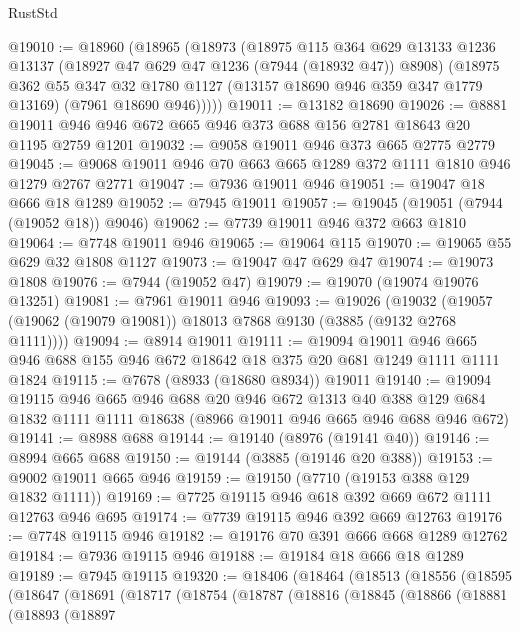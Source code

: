 \begin{lexlean}{RustStd}
\begin{coremodule}
@19010 := @18960
    (@18965
      (@18973
        (@18975
          @115
          @364
          @629
          @13133
          @1236
          @13137
          (@18927 @47 @629 @47 @1236 (@7944 (@18932 @47)) @8908)
          (@18975
            @362
            @55
            @347
            @32
            @1780
            @1127
            (@13157 @18690 @946 @359 @347 @1779 @13169)
            (@7961 @18690 @946)))))
@19011 := @13182 @18690
@19026 := @8881 @19011 @946 @946 @672 @665 @946 @373 @688 @156 @2781 @18643 @20 @1195 @2759 @1201
@19032 := @9058 @19011 @946 @373 @665 @2775 @2779
@19045 := @9068 @19011 @946 @70 @663 @665 @1289 @372 @1111 @1810 @946 @1279 @2767 @2771
@19047 := @7936 @19011 @946
@19051 := @19047 @18 @666 @18 @1289
@19052 := @7945 @19011
@19057 := @19045 (@19051 (@7944 (@19052 @18)) @9046)
@19062 := @7739 @19011 @946 @372 @663 @1810
@19064 := @7748 @19011 @946
@19065 := @19064 @115
@19070 := @19065 @55 @629 @32 @1808 @1127
@19073 := @19047 @47 @629 @47
@19074 := @19073 @1808
@19076 := @7944 (@19052 @47)
@19079 := @19070 (@19074 @19076 @13251)
@19081 := @7961 @19011 @946
@19093 := @19026
    (@19032 (@19057 (@19062 (@19079 @19081)) @18013 @7868 @9130 (@3885 (@9132 @2768 @1111))))
@19094 := @8914 @19011
@19111 := @19094
    @19011
    @946
    @665
    @946
    @688
    @155
    @946
    @672
    @18642
    @18
    @375
    @20
    @681
    @1249
    @1111
    @1111
    @1824
@19115 := @7678 (@8933 (@18680 @8934)) @19011
@19140 := @19094
    @19115
    @946
    @665
    @946
    @688
    @20
    @946
    @672
    @1313
    @40
    @388
    @129
    @684
    @1832
    @1111
    @1111
    @18638
    (@8966 @19011 @946 @665 @946 @688 @946 @672)
@19141 := @8988 @688
@19144 := @19140 (@8976 (@19141 @40))
@19146 := @8994 @665 @688
@19150 := @19144 (@3885 (@19146 @20 @388))
@19153 := @9002 @19011 @665 @946
@19159 := @19150 (@7710 (@19153 @388 @129 @1832 @1111))
@19169 := @7725 @19115 @946 @618 @392 @669 @672 @1111 @12763 @946 @695
@19174 := @7739 @19115 @946 @392 @669 @12763
@19176 := @7748 @19115 @946
@19182 := @19176 @70 @391 @666 @668 @1289 @12762
@19184 := @7936 @19115 @946
@19188 := @19184 @18 @666 @18 @1289
@19189 := @7945 @19115
@19320 := @18406
    (@18464
      (@18513
        (@18556
          (@18595
            (@18647
              (@18691
                (@18717
                  (@18754
                    (@18787
                      (@18816
                        (@18845
                          (@18866
                            (@18881
                              (@18893
                                (@18897

\end{coremodule}
\end{lexlean}

